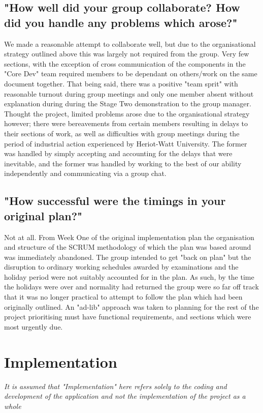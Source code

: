 \documentclass[11pt, oneside, a4paper]{report}   %
\begin{document}
\subsection{"How well did your group collaborate? How did you handle any problems which arose?"} \label{sec:Organisation - 2}
We made a reasonable attempt to collaborate well, but due to the organisational strategy outlined above this was largely not required from the group. Very few sections, 
with the exception of cross communication of the components in the "Core Dev" team required members to be dependant on others/work on the same document 
together. That being said, there was a positive "team sprit" with reasonable turnout during group meetings and only one member absent without explanation during during
the Stage Two demonstration to the group manager. Thought the project, limited problems arose due to the organisational strategy however;  there were bereavements from 
certain members resulting in delays to their sections of work, as well as difficulties with group meetings during the period of industrial action experienced by Heriot-Watt University.
The former was handled by simply accepting and accounting for the delays that were inevitable, and the former was handled by working to the best of our ability independently and 
communicating via a group chat.
\subsection{"How successful were the timings in your original plan?"} \label{sec:Organisation - 3}
Not at all. From Week One of the original implementation plan the organisation and structure of the SCRUM methodology of which the plan was based around was immediately 
abandoned. The group intended to get "back on plan" but the disruption to ordinary working schedules awarded by examinations and the holiday period were not suitably accounted 
for in the plan. As such, by the time the holidays were over and normality had returned the group were so far off track that it was no longer practical to attempt to follow the plan 
which had been originally outlined. An "ad-lib" approach was taken to planning for the rest of the project prioritising must have functional requirements, and sections which were most
urgently due. 
\pagebreak
\section{Implementation}
\textit{It is assumed that "Implementation" here refers solely to the coding and development of the application and not the implementation of the project as a whole}
\end{document}
